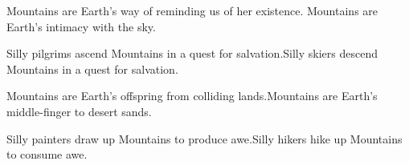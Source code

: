\documentclass{article}
\begin{document}
\newline

Mountains are Earth's way of reminding us of her existence.\newline
Mountains are Earth's intimacy with the sky.\newline \newline

Silly pilgrims ascend Mountains in a quest for salvation.\newline Silly
skiers descend Mountains in a quest for salvation.\newline\newline

Mountains are Earth's offspring from colliding lands.\newline Mountains
are Earth's middle-finger to desert sands.\newline\newline

Silly painters draw up Mountains to produce awe.\newline Silly hikers
hike up Mountains to consume awe.\newline\newline
\end{document}
